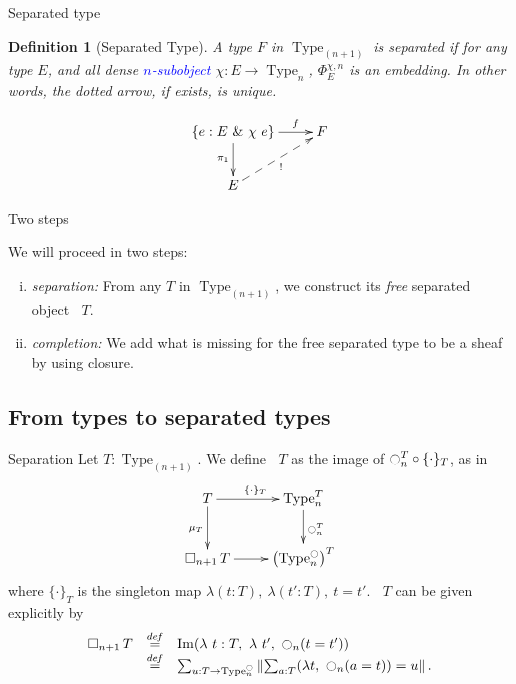 \documentclass{beamer}
\newtheorem{defi}[thm]{Definition}
\newcommand \defeq {\overset{de\hspace{-0.2ex}f}{=}}
\DeclareMathOperator{\Type}{Type}
\DeclareMathOperator{\im}{Im}
\newcommand{\modal}{\ensuremath{\ocircle}}
\newcommand \separated {\mathop{\square_{n+1}} }
\newcommand{\nType}[1]{\Type_{#1}}
\begin{document}
\begin{frame}{Separated type}
  \begin{defi}[Separated Type]
    A type $F$ in $\nType {(n+1)}$ is {\em separated} if for any type $E$, and
    all dense \textcolor{blue}{$n$-subobject} $\chi : E \to \nType n$,
    $\Phi_E^{\chi,n}$ is an embedding. In other words, the dotted arrow,
    if exists, is unique.

    $$\xymatrix{
      \{e:E~\&~\chi~e\}  \ar[r]^-f \ar[d]_{\pi_1} & F \\
      E \ar@{-->}[ru]_{!}&
    }$$
  \end{defi}
\end{frame}


\begin{frame}{Two steps}
  \note{ }

  We will proceed in two steps: 
  \begin{enumerate}[(i)]
  \item {\em separation:} From any $T$ in $\nType {(n+1)}$, we construct
    its {\em free} separated object $\separated T$.
  \item {\em completion:} We add what is missing for the free 
    separated type to be a sheaf by using closure.
  \end{enumerate}
\end{frame}


\subsection[Separation]{From types to separated types}
\label{sec:from-types-separated}

\begin{frame}{}{Separation}
  \note{ }
  Let $T : \nType {(n+1)}$. We define $\separated T$ as the image of
  $\modal_n^T \circ \{\cdot\}_T$, as in
  $$\xymatrix{
    T \ar[r]^{\{\cdot\}_T} \ar[d]_{\mu_T} & \nType n^T \ar[d]^{\modal_n^T} \\
    \separated T \ar[r]& \left( \nType n^\modal \right)^T
  }$$
  where $\{\cdot\}_T$ is the singleton map $\lambda (t:T),~\lambda
  (t':T),~t=t'$.
  \pause
  $\separated T$ can be given explicitly by
  $$
  \begin{array}{rcl}
    \separated T &\defeq & \im (\lambda~t:T,~\lambda~ t',~ \modal_n (t = t')) \\
                 & \defeq & \sum_{u:T \to \nType n^\modal} \left\| \sum_{a:T} 
                            (\lambda t,~\modal_n (a=t)) = u\right\|.
  \end{array}
  $$
\end{frame}
\end{document}
